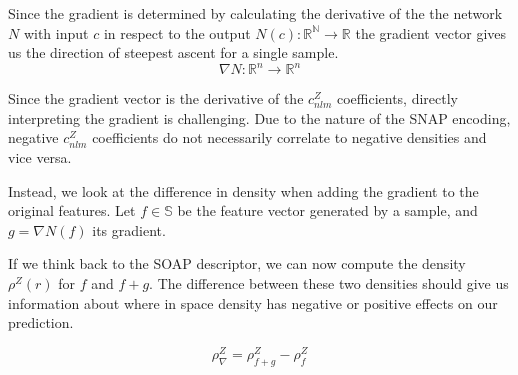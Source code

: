 Since the gradient is determined by calculating the derivative of the the network $N$ with input $c$ in respect to the output $N(c): \mathbb{R^N} \to \mathbb{R}$
the gradient vector gives us the direction of steepest ascent for a single sample.
$$
\nabla N: \mathbb{R}^n  \to \mathbb{R}^n 
$$

Since the gradient vector is the derivative of the $c_{nlm}^Z$ coefficients, 
directly interpreting the gradient is challenging. 
Due to the nature of the SNAP encoding, negative $c_{nlm}^Z$ coefficients do not necessarily correlate to negative densities and vice versa.

Instead, we look at the difference in density when adding the gradient to the original features.
Let $f \in \mathbb{S}$ be the feature vector generated by a sample, and $g = \nabla N(f)$ its gradient.

If we think back to the SOAP descriptor, we can now compute the density $\rho^Z(r)$ for $f$ and $f + g$.
The difference between these two densities should give us information about where in space density has negative or positive effects on our prediction.

$$ \rho^Z_\nabla = \rho^Z_{f+g} -  \rho^Z_{f} $$

